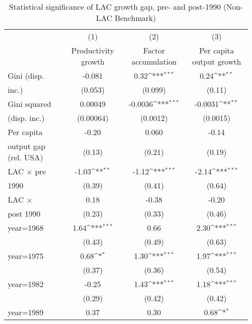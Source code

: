 \begin{sidewaystable}[htbp]\centering
\def\sym#1{\ifmmode^{#1}\else\(^{#1}\)\fi}
\caption{Statistical significance of LAC growth gap, pre- and post-1990 (Non-LAC Benchmark)}
\begin{tabular}{l*{3}{c}}
\toprule
                &\multicolumn{1}{c}{(1)}&\multicolumn{1}{c}{(2)}&\multicolumn{1}{c}{(3)}\\
                &\multicolumn{1}{c}{Productivity growth}&\multicolumn{1}{c}{Factor accumulation}&\multicolumn{1}{c}{Per capita output growth}\\
\midrule
Gini (disp.     &   -0.081         &     0.32\sym{***}&     0.24\sym{**} \\
inc.)           &  (0.053)         &  (0.099)         &   (0.11)         \\
\addlinespace
Gini squared    &  0.00049         &  -0.0036\sym{***}&  -0.0031\sym{**} \\
(disp. inc.)    &(0.00064)         & (0.0012)         & (0.0015)         \\
\addlinespace
Per capita      &    -0.20         &    0.060         &    -0.14         \\
output gap (rel. USA)&   (0.13)         &   (0.21)         &   (0.19)         \\
\addlinespace
LAC $\times$ pre&    -1.03\sym{**} &    -1.12\sym{***}&    -2.14\sym{***}\\
1990            &   (0.39)         &   (0.41)         &   (0.64)         \\
\addlinespace
LAC $\times$    &     0.18         &    -0.38         &    -0.20         \\
post 1990       &   (0.23)         &   (0.33)         &   (0.46)         \\
\addlinespace
year=1968       &     1.64\sym{***}&     0.66         &     2.30\sym{***}\\
                &   (0.43)         &   (0.49)         &   (0.63)         \\
\addlinespace
year=1975       &     0.68\sym{*}  &     1.30\sym{***}&     1.97\sym{***}\\
                &   (0.37)         &   (0.36)         &   (0.54)         \\
\addlinespace
year=1982       &    -0.25         &     1.43\sym{***}&     1.18\sym{***}\\
                &   (0.29)         &   (0.42)         &   (0.42)         \\
\addlinespace
year=1989       &     0.37         &     0.30         &     0.68\sym{*}  \\

\end{tabular}
\end{sidewaystable}

